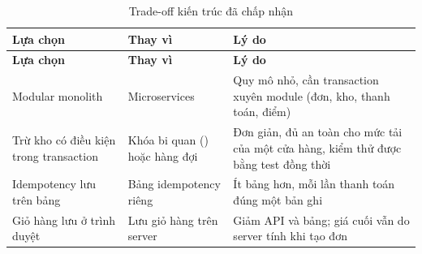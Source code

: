 {\small
\begin{longtable}{@{}L{3.8cm}L{4.4cm}L{5.7cm}@{}}
\caption{Trade-off kiến trúc đã chấp nhận}\label{tab:tradeoff}\\
\toprule
\textbf{Lựa chọn} & \textbf{Thay vì} & \textbf{Lý do} \\ \midrule \endfirsthead
\toprule \textbf{Lựa chọn} & \textbf{Thay vì} & \textbf{Lý do} \\ \midrule \endhead
\bottomrule \endfoot
Modular monolith & Microservices & Quy mô nhỏ, cần transaction xuyên module (đơn, kho, thanh toán, điểm) \\
Trừ kho có điều kiện trong transaction & Khóa bi quan () hoặc hàng đợi & Đơn giản, đủ an toàn cho mức tải của một cửa hàng, kiểm thử được bằng test đồng thời \\
Idempotency lưu trên bảng  & Bảng idempotency riêng & Ít bảng hơn, mỗi lần thanh toán đúng một bản ghi \\
Giỏ hàng lưu ở trình duyệt & Lưu giỏ hàng trên server & Giảm API và bảng; giá cuối vẫn do server tính khi tạo đơn \\
\end{longtable}
}